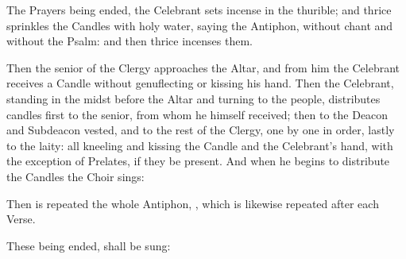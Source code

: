 \begin{rubric}
    The Prayers being ended, the Celebrant sets incense in the thurible; and thrice sprinkles the Candles with holy water, saying the Antiphon,  without chant and without the Psalm: and then thrice incenses them.
\end{rubric}
\begin{rubric}
    Then the senior of the Clergy approaches the Altar, and from him the Celebrant receives a Candle without genuflecting or kissing his hand. Then the Celebrant, standing in the midst before the Altar and turning to the people, distributes candles first to the senior, from whom he himself received; then to the Deacon and Subdeacon vested, and to the rest of the Clergy, one by one in order, lastly to the laity: all kneeling and kissing the Candle and the Celebrant's hand, with the exception of Prelates, if they be present. And when he begins to distribute the Candles the Choir sings:
\end{rubric}



\begin{rubric}
    Then is repeated the whole Antiphon, , which is likewise repeated after each Verse.
\end{rubric}





\begin{rubric}
    These being ended, shall be sung:
\end{rubric}



